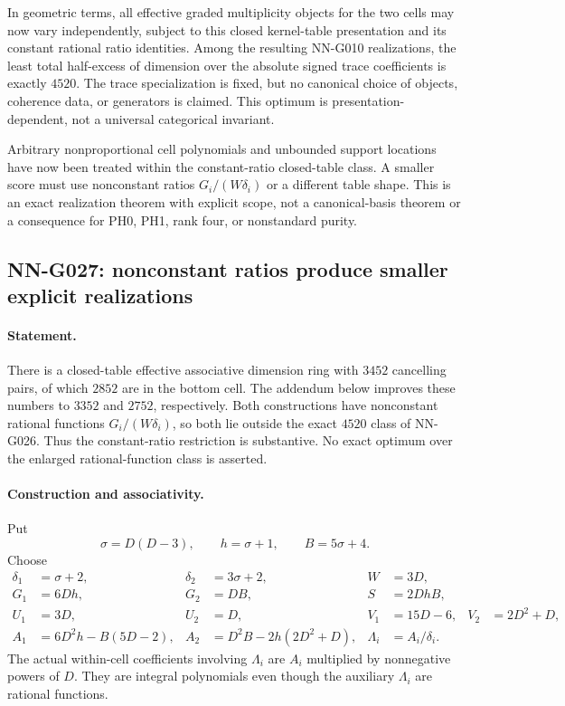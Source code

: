 In geometric terms, all effective graded multiplicity objects
for the two cells may now vary independently, subject to this
closed kernel-table presentation and its constant rational
ratio identities. Among the resulting NN-G010 realizations,
the least total half-excess of dimension over the absolute
signed trace coefficients is exactly $4520$. The trace
specialization is fixed, but no canonical choice of objects,
coherence data, or generators is claimed. This optimum is
presentation-dependent, not a universal categorical invariant.

Arbitrary nonproportional cell polynomials and
unbounded support locations have now been treated
within the constant-ratio closed-table class. A
smaller score must use nonconstant ratios
$G_i/(W\delta_i)$ or a different table shape.
This is an exact realization theorem with explicit
scope, not a canonical-basis theorem or a consequence
for PH0, PH1, rank four, or nonstandard purity.

\subsection{NN-G027: nonconstant ratios produce smaller explicit realizations}
\paragraph{Statement.}
There is a closed-table effective associative dimension ring
with $3452$ cancelling pairs, of which $2852$ are in the
bottom cell. The addendum below improves these numbers to
$3352$ and $2752$, respectively. Both constructions have
nonconstant rational functions
$G_i/(W\delta_i)$, so both lie outside the exact $4520$
class of NN-G026. Thus the constant-ratio restriction is
substantive. No exact optimum over the enlarged rational-function
class is asserted.

\paragraph{Construction and associativity.}
Put
\[
 \sigma=D(D-3),\qquad h=\sigma+1,\qquad B=5\sigma+4.
\]
Choose
\[
 \begin{aligned}
 \delta_1&=\sigma+2,&\delta_2&=3\sigma+2,&W&=3D,\\
 G_1&=6Dh,&G_2&=DB,&S&=2DhB,\\
 U_1&=3D,&U_2&=D,&V_1&=15D-6,&V_2&=2D^2+D,\\
 A_1&=6D^2h-B(5D-2),&
 A_2&=D^2B-2h(2D^2+D),&
 \Lambda_i&=A_i/\delta_i.
 \end{aligned}                                                       \tag{G027.1}
\]
The actual within-cell coefficients involving $\Lambda_i$
are $A_i$ multiplied by nonnegative powers of $D$.
They are integral polynomials even though the auxiliary
$\Lambda_i$ are rational functions.


